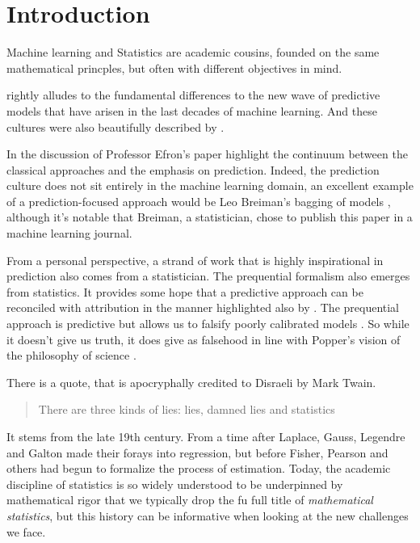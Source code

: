\documentclass[a4paperpaper,]{article}
\begin{document}



\hypertarget{introduction}{%
\section{Introduction}\label{introduction}}

Machine learning and Statistics are academic cousins, founded on the
same mathematical princples, but often with different objectives in
mind. 

\citet{Efron:prediction20} rightly alludes to the fundamental
differences to the new wave of predictive models that have arisen in the
last decades of machine learning. And these cultures were also
beautifully described by \citet{Breiman:cultures00}.

In the discussion of Professor Efron's paper
\citet{Friedman:discussion20} highlight the continuum between the
classical approaches and the emphasis on prediction. Indeed, the
prediction culture does not sit entirely in the machine learning domain,
an excellent example of a prediction-focused approach would be Leo
Breiman's bagging of models \citep{Breiman:bagging96}, although it's
notable that Breiman, a statistician, chose to publish this paper in a
machine learning journal.

From a personal perspective, a strand of work that is highly
inspirational in prediction also comes from a statistician. The
prequential formalism \citep{Dawid:callibrated82, Dawid:prequential84}
also emerges from statistics. It provides some hope that a predictive
approach can be reconciled with attribution in the manner highlighted
also by \citet{Friedman:discussion20}. The prequential approach is
predictive but allows us to falsify poorly calibrated models
\citep{Lawrence:licsbintro10}. So while it doesn't give us truth, it
does give as falsehood in line with Popper's vision of the philosophy of
science \citep{Popper:conjectures63}.

There is a quote, that is apocryphally credited to Disraeli by Mark
Twain.

\begin{quote}
There are three kinds of lies: lies, damned lies and statistics
\end{quote}

It stems from the late 19th century. From a time after Laplace, Gauss,
Legendre and Galton made their forays into regression, but before
Fisher, Pearson and others had begun to formalize the process of
estimation. Today, the academic discipline of statistics is so widely
understood to be underpinned by mathematical rigor that we typically
drop the fu full title of \emph{mathematical statistics}, but this
history can be informative when looking at the new challenges we face.
\end{document}
